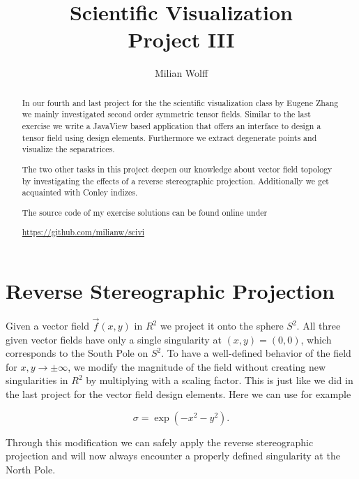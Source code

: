 \documentclass[a4paper,10pt,notitlepage]{scrartcl}
\title{Scientific Visualization\\Project III}
\author{Milian Wolff}
\begin{document}
\maketitle

\begin{abstract}
In our fourth and last project for the the scientific visualization class
by Eugene Zhang we mainly investigated second order symmetric tensor fields.
Similar to the last exercise we write a JavaView based application that offers
an interface to design a tensor field using design elements. Furthermore we
extract degenerate points and visualize the separatrices.

The two other tasks in this project deepen our knowledge about vector field
topology by investigating the effects of a reverse stereographic projection.
Additionally we get acquainted with Conley indizes.

The source code of my exercise solutions can be found online under

\begin{center}\url{https://github.com/milianw/scivi}\end{center}
\end{abstract}

\begingroup
\let\clearpage\relax

\tableofcontents
\endgroup

\newpage

\section{Reverse Stereographic Projection}

Given a vector field $\vec{f}(x,y)$ in $R^2$ we project it onto the sphere
$S^2$. All three given vector fields have only a single singularity at $(x,y) =
(0,0)$, which corresponds to the South Pole on $S^2$. To have a well-defined
behavior of the field for $x,y \rightarrow \pm \infty$, we modify the magnitude
of the field without creating new singularities in $R^2$ by multiplying with a
scaling factor. This is just like we did in the last project for the vector
field design elements. Here we can use for example

\begin{equation}
 \sigma = \exp(-x^2-y^2).
\end{equation}

Through this modification we can safely apply the reverse stereographic
projection and will now always encounter a properly defined singularity at the
North Pole.
\end{document}
